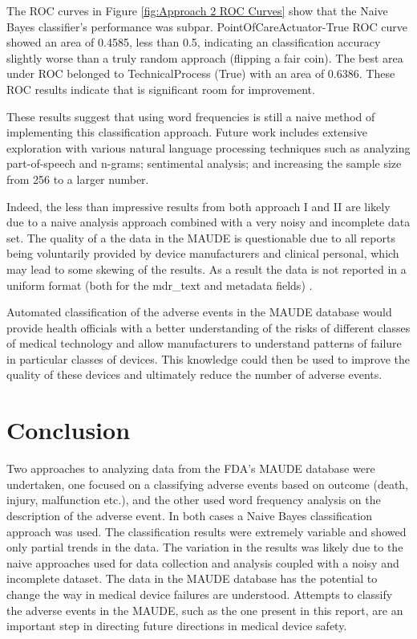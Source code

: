 \documentclass[11pt, notitlepage,abstracton,oneside]{article}   	%
\begin{document}
The ROC curves in Figure \ref{fig:Approach 2 ROC Curves} show that the Naive Bayes classifier's performance was subpar. PointOfCareActuator-True ROC curve showed an area of 0.4585, less than 0.5, indicating an classification accuracy slightly worse than a truly random approach (flipping a fair coin). The best area under ROC belonged to TechnicalProcess (True) with an area of 0.6386. These ROC results indicate that is significant room for improvement. 

These results suggest that using word frequencies is still a naive method of implementing this classification approach. Future work includes extensive exploration with various natural language processing techniques such as analyzing part-of-speech and n-grams; sentimental analysis; and increasing the sample size from 256 to a larger number.

Indeed, the less than impressive results from both approach I and II are likely due to a naive analysis approach combined with a very noisy and incomplete data set. The quality of a the data in the MAUDE is questionable due to all reports being voluntarily provided by device manufacturers and clinical personal, which may lead to some skewing of the results. As a result the data is not reported in a uniform format (both for the mdr\_text and metadata fields) \cite{weber_preliminary_2011, fuller_electrosurgical_2012}. 

Automated classification of the adverse events in the MAUDE database would provide health officials with a better understanding of the risks of different classes of medical technology and allow manufacturers to understand patterns of failure in particular classes of devices. This knowledge could then be used to improve the quality of these devices and ultimately reduce the number of adverse events. 

\section{Conclusion}
Two approaches to analyzing data from the FDA's MAUDE database were undertaken, one focused on a classifying adverse events based on outcome (death, injury, malfunction etc.), and the other used word frequency analysis on the description of the adverse event. In both cases a Naive Bayes classification approach was used. The classification results were extremely variable and showed only partial trends in the data. The variation in the results was likely due to the naive approaches used for data collection and analysis coupled with a noisy and incomplete dataset. The data in the MAUDE database has the potential to change the way in medical device failures are understood. Attempts to classify the adverse events in the MAUDE, such as the one present in this report, are an important step in directing future directions in medical device safety. 
\newpage 
\end{document}
